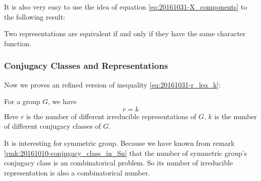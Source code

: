     It is also very easy to use the idea of equation
    \ref{eq:20161031-X_components} to the following result:
    \begin{thm}
        Two representations are equivalent if and only if they have
        the same character function.
    \end{thm}
    \subsubsection{Conjugacy Classes and Representations}
    \label{sec:Conjugacy-Classes-and-Representations}
    
    Now we proves an refined version of inequality
    \ref{eq:20161031-r_leq_k}:
    \begin{thm}
        For a group $G$, we have
        \begin{equation}
            r=k
        \end{equation}
        Here $r$ is the number of different irreducible
        representations of $G$, $k$ is the number of different conjugacy
        classes of $G$.
    \end{thm}
    \begin{ex}
        It is interesting for symmetric group. Because we have known
        from remark \ref{rmk:20161010-conjugacy_class_in_Sn} that the
        number of symmetric group's conjugacy class is an
        combinatorical problem. So its number of irreducible
        representation is also a combinatorical number.
    \end{ex}
